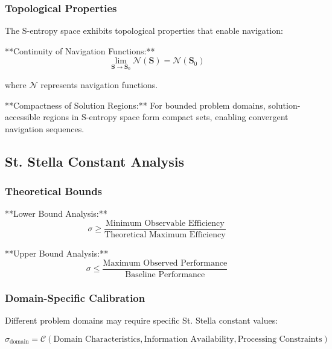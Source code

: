 \documentclass[11pt]{article}
\begin{document}
\subsubsection{Topological Properties}

The S-entropy space exhibits topological properties that enable navigation:

**Continuity of Navigation Functions:**
\begin{equation}
\lim_{\mathbf{S} \to \mathbf{S}_0} \mathcal{N}(\mathbf{S}) = \mathcal{N}(\mathbf{S}_0)
\label{eq:navigation_continuity}
\end{equation}

where $\mathcal{N}$ represents navigation functions.

**Compactness of Solution Regions:**
For bounded problem domains, solution-accessible regions in S-entropy space form compact sets, enabling convergent navigation sequences.

\subsection{St. Stella Constant Analysis}

\subsubsection{Theoretical Bounds}

**Lower Bound Analysis:**
\begin{equation}
\sigma \geq \frac{\text{Minimum Observable Efficiency}}{\text{Theoretical Maximum Efficiency}}
\label{eq:stella_lower_bound}
\end{equation}

**Upper Bound Analysis:**
\begin{equation}
\sigma \leq \frac{\text{Maximum Observed Performance}}{\text{Baseline Performance}}
\label{eq:stella_upper_bound}
\end{equation}

\subsubsection{Domain-Specific Calibration}

Different problem domains may require specific St. Stella constant values:

\begin{equation}
\sigma_{\text{domain}} = \mathcal{C}(\text{Domain Characteristics}, \text{Information Availability}, \text{Processing Constraints})
\label{eq:domain_specific_stella}
\end{equation}
\end{document}
